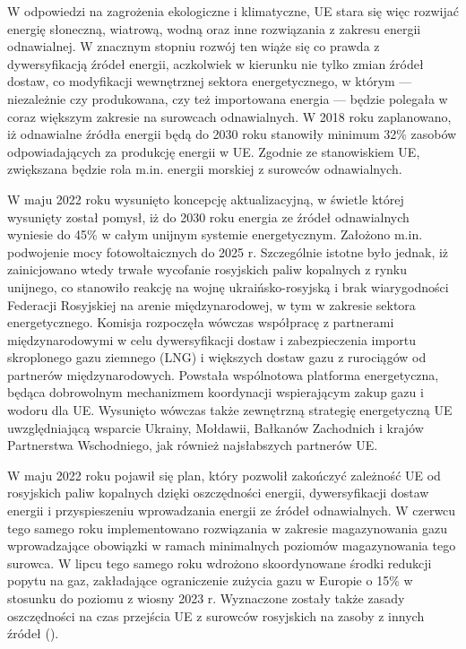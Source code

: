 \documentclass[polish, twoside, 12pt, a4paper]{article}
\theoremstyle{definition}
\theoremstyle{plain}
\theoremstyle{remark}
\begin{document}
W odpowiedzi na zagrożenia ekologiczne i klimatyczne, UE stara się więc rozwijać energię słoneczną, wiatrową, wodną oraz inne rozwiązania z zakresu energii odnawialnej. W znacznym stopniu rozwój ten wiąże się co prawda z dywersyfikacją źródeł energii, aczkolwiek w kierunku nie tylko zmian źródeł dostaw, co modyfikacji wewnętrznej sektora energetycznego, w którym --- niezależnie czy produkowana, czy też importowana energia --- będzie polegała w coraz większym zakresie na surowcach odnawialnych. W 2018 roku zaplanowano, iż odnawialne źródła energii będą do 2030 roku stanowiły minimum 32\% zasobów odpowiadających za produkcję energii w UE. Zgodnie ze stanowiskiem UE, zwiększana będzie rola m.in. energii morskiej z surowców odnawialnych. 

W maju 2022 roku wysunięto koncepcję aktualizacyjną, w świetle której wysunięty został pomysł, iż do 2030 roku energia ze źródeł odnawialnych wyniesie do 45\% w całym unijnym systemie energetycznym. Założono m.in. podwojenie mocy fotowoltaicznych do 2025 r. Szczególnie istotne było jednak, iż zainicjowano wtedy trwałe wycofanie rosyjskich paliw kopalnych z rynku unijnego, co stanowiło reakcję na wojnę ukraińsko-rosyjską i brak wiarygodności Federacji Rosyjskiej na arenie międzynarodowej, w tym w zakresie sektora energetycznego. Komisja rozpoczęła wówczas współpracę z partnerami międzynarodowymi w celu dywersyfikacji dostaw i zabezpieczenia importu skroplonego gazu ziemnego (LNG) i większych dostaw gazu z rurociągów od partnerów międzynarodowych. Powstała wspólnotowa platforma energetyczna, będąca dobrowolnym mechanizmem koordynacji wspierającym zakup gazu i wodoru dla UE. Wysunięto wówczas także zewnętrzną strategię energetyczną UE uwzględniającą wsparcie Ukrainy, Mołdawii, Bałkanów Zachodnich i krajów Partnerstwa Wschodniego, jak również najsłabszych partnerów UE.

W maju 2022 roku pojawił się plan, który pozwolił zakończyć zależność UE od rosyjskich paliw kopalnych dzięki oszczędności energii, dywersyfikacji dostaw energii i przyspieszeniu wprowadzania energii ze źródeł odnawialnych. W czerwcu tego samego roku implementowano rozwiązania w zakresie magazynowania gazu wprowadzające obowiązki w ramach minimalnych poziomów magazynowania tego surowca. W lipcu tego samego roku wdrożono skoordynowane środki redukcji popytu na gaz, zakładające ograniczenie zużycia gazu w Europie o 15\% w stosunku do poziomu z wiosny 2023 r. Wyznaczone zostały także zasady oszczędności na czas przejścia UE z surowców rosyjskich na zasoby z innych źródeł (\cite{ep2023}). 
\end{document}
